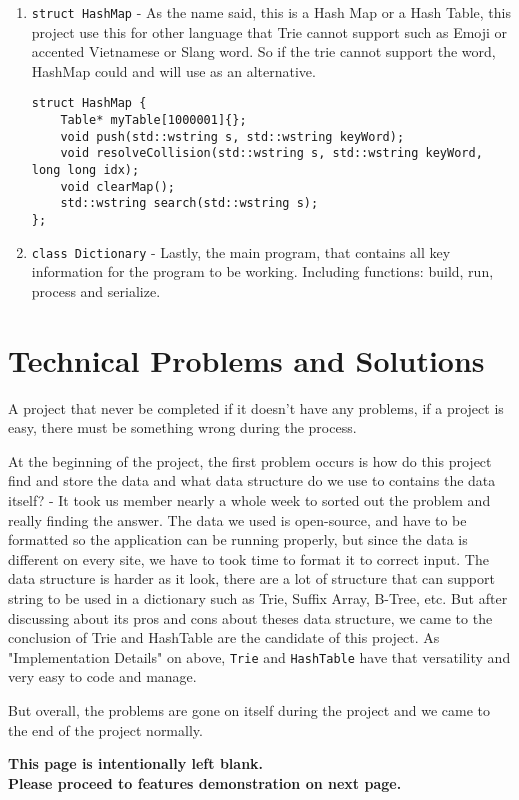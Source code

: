 \documentclass[sn-mathphys,Numbered]{sn-jnl}%
\begin{document}
\begin{enumerate}
	\item \lstinline|struct HashMap| - As the name said, this is a Hash Map or a Hash Table, this project use this for other language that Trie cannot support such as Emoji or accented Vietnamese or Slang word. So if the trie cannot support the word, HashMap could and will use as an alternative.
	\begin{lstlisting}
struct HashMap {
	Table* myTable[1000001]{};
	void push(std::wstring s, std::wstring keyWord);
	void resolveCollision(std::wstring s, std::wstring keyWord, long long idx);
	void clearMap();
	std::wstring search(std::wstring s);
};
	\end{lstlisting}
	
	\item \lstinline|class Dictionary| - Lastly, the main program, that contains all key information for the program to be working. Including functions: build, run, process and serialize.
\end{enumerate}

\section{Technical Problems and Solutions}

A project that never be completed if it doesn't have any problems, if a project is easy, there must be something wrong during the process.

At the beginning of the project, the first problem occurs is how do this project find and store the data and what data structure do we use to contains the data itself? - It took us member nearly a whole week to sorted out the problem and really finding the answer. The data we used is open-source, and have to be formatted so the application can be running properly, but since the data is different on every site, we have to took time to format it to correct input. The data structure is harder as it look, there are a lot of structure that can support string to be used in a dictionary such as Trie, Suffix Array, B-Tree, etc. But after discussing about its pros and cons about theses data structure, we came to the conclusion of Trie and HashTable are the candidate of this project. As "Implementation Details" on above, \lstinline|Trie| and \lstinline|HashTable| have that versatility and very easy to code and manage.

But overall, the problems are gone on itself during the project and we came to the end of the project normally.

\vspace{0.25\textheight}
\begin{minipage}{1\textwidth}
	\centering
	\large\textbf{This page is intentionally left blank.\\
		Please proceed to features demonstration on next page.}
\end{minipage}
\end{document}

